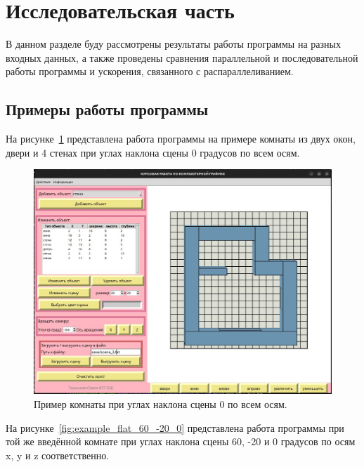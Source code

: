 \section{Исследовательская часть}

\hspace{1.25cm}
В данном разделе буду рассмотрены результаты работы программы на разных входных данных, а также проведены сравнения параллельной и последовательной работы программы и ускорения, связанного с распараллеливанием.


\subsection{Примеры работы программы}

\hspace{1.25cm}
На рисунке~\ref{fig:example_flat_0_0_0} представлена работа программы на примере комнаты из двух окон, двери и 4 стенах при углах наклона сцены 0 градусов по всем осям.

\begin{figure}[H]
    \centering
    \includegraphics[width=1\textwidth]{img/example_flat_0_0_0.png}
    \caption{Пример комнаты при углах наклона сцены 0 по всем осям.}
    \label{fig:example_flat_0_0_0}
\end{figure}

На рисунке~\ref{fig:example_flat_60_-20_0} представлена работа программы при той же введённой комнате при углах наклона сцены 60, -20 и 0 градусов по осям x, y и z соответственно.

